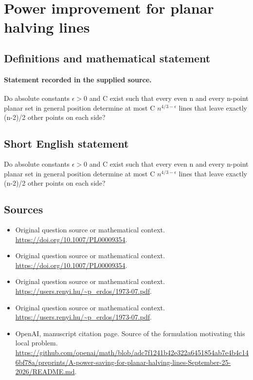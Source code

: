 \documentclass[11pt]{article}
\begin{document}
\section*{Power improvement for planar halving lines}\label{30007091}
\subsection{Definitions and mathematical statement}
\paragraph{Statement recorded in the supplied source.}
Do absolute constants $\epsilon >0$ and C exist such that every even n and every n-point planar set in general position determine at most C $n^{4/3-\epsilon }$ lines that leave exactly (n-2)/2 other points on each side?
\subsection{Short English statement}
Do absolute constants $\epsilon >0$ and C exist such that every even n and every n-point planar set in general position determine at most C $n^{4/3-\epsilon }$ lines that leave exactly (n-2)/2 other points on each side?
\subsection{Sources}
\begin{itemize}
\item[S1] Original question source or mathematical context.
\url{https://doi.org/10.1007/PL00009354}.
\item[S2] Original question source or mathematical context.
\url{https://doi.org/10.1007/PL00009354}.
\item[S3] Original question source or mathematical context.
\url{https://users.renyi.hu/~p_erdos/1973-07.pdf}.
\item[S4] Original question source or mathematical context.
\url{https://users.renyi.hu/~p_erdos/1973-07.pdf}.
\item[S5] OpenAI, manuscript citation page. Source of the formulation motivating this local problem.
\url{https://github.com/openai/math/blob/adc7f1241b42e322a6451854ab7e4b4c146bf78a/preprints/A-power-saving-for-planar-halving-lines-September-25-2026/README.md}.
\end{itemize}
\end{document}
